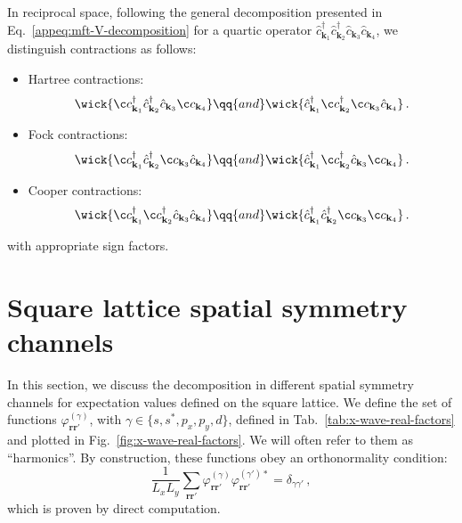 In reciprocal space, following the general decomposition presented in Eq.~\eqref{appeq:mft-V-decomposition} for a quartic operator $\hat c_{\mathbf{k}_1}^\dagger \hat c_{\mathbf{k}_2}^\dagger \hat c_{\mathbf{k}_3} \hat c_{\mathbf{k}_4}$, we distinguish contractions as follows:
\begin{itemize}
	\item Hartree contractions:
	\[
		\wick{
			\c c_{\mathbf{k}_1}^\dagger \hat c_{\mathbf{k}_2}^\dagger \hat c_{\mathbf{k}_3} \c c_{\mathbf{k}_4}
		}
		\qq{and}
		\wick{
			\hat c_{\mathbf{k}_1}^\dagger \c c_{\mathbf{k}_2}^\dagger \c c_{\mathbf{k}_3} \hat c_{\mathbf{k}_4}
		} \, .
	\]
	\item Fock contractions:
	\[
		\wick{
			\c c_{\mathbf{k}_1}^\dagger \hat c_{\mathbf{k}_2}^\dagger \c c_{\mathbf{k}_3} \hat c_{\mathbf{k}_4}
		}
		\qq{and}
		\wick{
			\hat c_{\mathbf{k}_1}^\dagger \c c_{\mathbf{k}_2}^\dagger \hat c_{\mathbf{k}_3} \c c_{\mathbf{k}_4}
		} \, .
	\]
	\item Cooper contractions:
	\[
		\wick{
			\c c_{\mathbf{k}_1}^\dagger \c c_{\mathbf{k}_2}^\dagger \hat c_{\mathbf{k}_3} \hat c_{\mathbf{k}_4}
		}
		\qq{and}
		\wick{
			\hat c_{\mathbf{k}_1}^\dagger \hat c_{\mathbf{k}_2}^\dagger \c c_{\mathbf{k}_3} \c c_{\mathbf{k}_4}
		} \, .
	\]
\end{itemize}
with appropriate sign factors.

\section{Square lattice spatial symmetry channels}\label{sec:square-lattice-symmetries}

In this section, we discuss the decomposition in different spatial symmetry channels for expectation values defined on the square lattice. We define the set of functions $\varphi_{\mathbf{r}\mathbf{r}'}^{(\gamma)}$, with $\gamma \in \lbrace s,s^*,p_x,p_y, d \rbrace$, defined in Tab.~\ref{tab:x-wave-real-factors} and plotted in Fig.~\ref{fig:x-wave-real-factors}. We will often refer to them as ``harmonics''. By construction, these functions obey an orthonormality condition:
\begin{equation}\label{eq:vphi-ortho}
	\frac{1}{L_x L_y} \sum_{\mathbf{r}\mathbf{r}'} \varphi_{\mathbf{r}\mathbf{r}'}^{(\gamma)} \varphi_{\mathbf{r}\mathbf{r}'}^{(\gamma')*} = \delta_{\gamma\gamma'} \, ,
\end{equation}
which is proven by direct computation.

